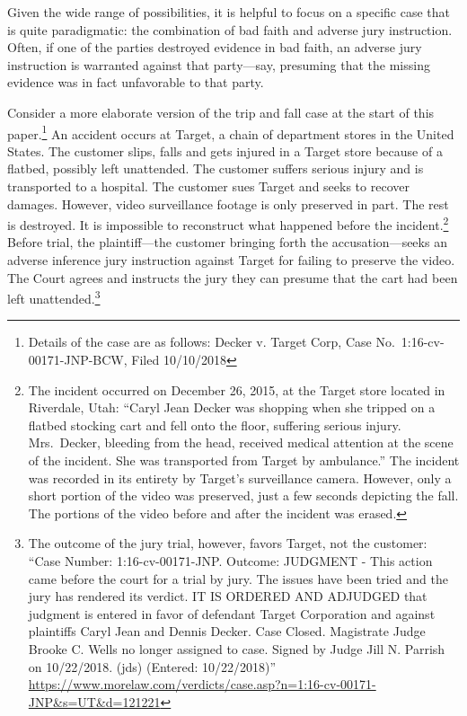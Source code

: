 \documentclass[
  10pt,
  dvipsnames,enabledeprecatedfontcommands]{scrartcl}
\begin{document}
Given the wide range of possibilities, it is helpful to focus on a
specific case that is quite paradigmatic: the combination of bad faith
and adverse jury instruction. Often, if one of the parties destroyed
evidence in bad faith, an adverse jury instruction is warranted against
that party---say, presuming that the missing evidence was in fact
unfavorable to that party.

Consider a more elaborate version of the trip and fall case at the start
of this paper.\footnote{Details of the case are as follows: Decker v.
  Target Corp, Case No.~1:16-cv-00171-JNP-BCW, Filed 10/10/2018} An
accident occurs at Target, a chain of department stores in the United
States. The customer slips, falls and gets injured in a Target store
because of a flatbed, possibly left unattended. The customer suffers
serious injury and is transported to a hospital. The customer sues
Target and seeks to recover damages. However, video surveillance footage
is only preserved in part. The rest is destroyed. It is impossible to
reconstruct what happened before the incident.\footnote{The incident
  occurred on December 26, 2015, at the Target store located in
  Riverdale, Utah: ``Caryl Jean Decker was shopping when she tripped on
  a flatbed stocking cart and fell onto the floor, suffering serious
  injury. Mrs.~Decker, bleeding from the head, received medical
  attention at the scene of the incident. She was transported from
  Target by ambulance.'' The incident was recorded in its entirety by
  Target's surveillance camera. However, only a short portion of the
  video was preserved, just a few seconds depicting the fall. The
  portions of the video before and after the incident was erased.}
Before trial, the plaintiff---the customer bringing forth the
accusation---seeks an adverse inference jury instruction against Target
for failing to preserve the video. The Court agrees and instructs the
jury they can presume that the cart had been left unattended.\footnote{The
  outcome of the jury trial, however, favors Target, not the customer:
  ``Case Number: 1:16-cv-00171-JNP. Outcome: JUDGMENT - This action came
  before the court for a trial by jury. The issues have been tried and
  the jury has rendered its verdict. IT IS ORDERED AND ADJUDGED that
  judgment is entered in favor of defendant Target Corporation and
  against plaintiffs Caryl Jean and Dennis Decker. Case Closed.
  Magistrate Judge Brooke C. Wells no longer assigned to case. Signed by
  Judge Jill N. Parrish on 10/22/2018. (jds) (Entered: 10/22/2018)''
  \url{https://www.morelaw.com/verdicts/case.asp?n=1:16-cv-00171-JNP\&s=UT\&d=121221}}
\end{document}
